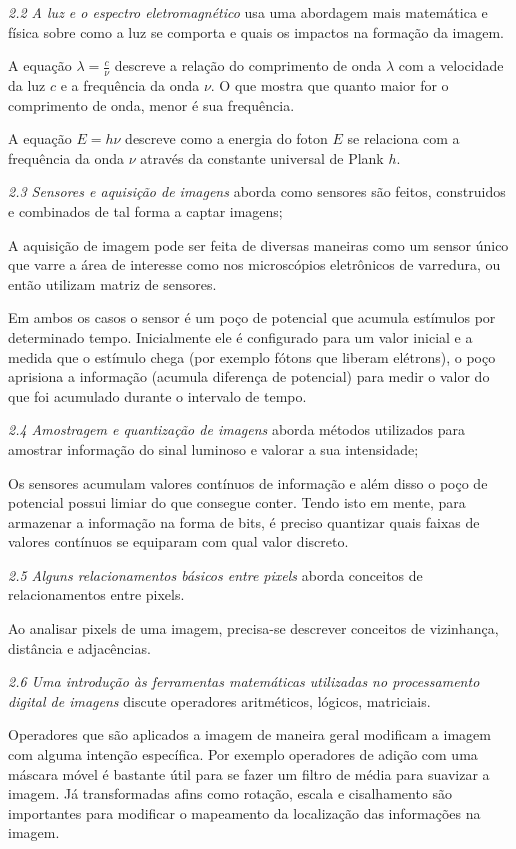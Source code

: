\documentclass[a4paper]{sbgames}               %
\begin{document}
\textit{2.2 A luz e o espectro eletromagnético} usa uma abordagem mais matemática e física sobre como a luz se comporta e quais os impactos na formação da imagem.

A equação $\lambda=\frac{c}{\nu}$ descreve a relação do comprimento de onda $\lambda$ com a velocidade da luz $c$ e a frequência da onda $\nu$. O que mostra que quanto maior for o comprimento de onda, menor é sua frequência.

A equação $E=h\nu$ descreve como a energia do foton $E$ se relaciona com a frequência da onda $\nu$ através da constante universal de Plank $h$.

\textit{2.3 Sensores e aquisição de imagens} aborda como sensores são feitos, construidos e combinados de tal forma a captar imagens; 

A aquisição de imagem pode ser feita de diversas maneiras como um sensor único que varre a área de interesse como nos microscópios eletrônicos de varredura, ou então utilizam matriz de sensores.

Em ambos os casos o sensor é um poço de potencial que acumula estímulos por determinado tempo. Inicialmente ele é configurado para um valor inicial e a medida que o estímulo chega (por exemplo fótons que liberam elétrons), o poço aprisiona a informação (acumula diferença de potencial) para medir o valor do que foi acumulado durante o intervalo de tempo. 

\textit{2.4 Amostragem e quantização de imagens} aborda métodos utilizados para amostrar informação do sinal luminoso e valorar a sua intensidade; 

Os sensores acumulam valores contínuos de informação e além disso o poço de potencial possui limiar do que consegue conter. Tendo isto em mente, para armazenar a informação na forma de bits, é preciso quantizar quais faixas de valores contínuos se equiparam com qual valor discreto.  

\textit{2.5 Alguns relacionamentos básicos entre pixels} aborda conceitos de relacionamentos entre pixels.

Ao analisar pixels de uma imagem, precisa-se descrever conceitos de vizinhança, distância e adjacências. 

\textit{2.6 Uma introdução às ferramentas matemáticas utilizadas no processamento digital de imagens} discute operadores aritméticos, lógicos, matriciais.

Operadores que são aplicados a imagem de maneira geral modificam a imagem com alguma intenção específica. Por exemplo operadores de adição com uma máscara móvel é bastante útil para se fazer um filtro de média para suavizar a imagem. Já transformadas afins como rotação, escala e cisalhamento são importantes para modificar o mapeamento da localização das informações na imagem.
\end{document}
